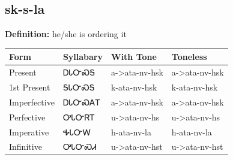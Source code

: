 \documentclass{article}%
\begin{document}
\subsection*{sk-s-la}%
\textbf{Definition: }%
he/she is ordering it%
\\[0.5em]%
\begin{tabular}{|l|l|l|l|}%
\hline%
\textbf{Form}&\textbf{Syllabary}&\textbf{With Tone}&\textbf{Toneless}\\%
\hline%
Present&ᎠᏓᏅᏍᎦ&a{-}>ata{-}nv{-}hsk&a{-}>ata{-}nv{-}hsk\\%
1st Present&ᎦᏓᏅᏍᎦ&k{-}ata{-}nv{-}hsk&k{-}ata{-}nv{-}hsk\\%
Imperfective&ᎠᏓᏅᏍᎪᎢ&a{-}>ata{-}nv{-}hsk&a{-}>ata{-}nv{-}hsk\\%
Perfective&ᎤᏓᏅᏒᎢ&u{-}>ata{-}nv{-}hs&u{-}>ata{-}nv{-}hs\\%
Imperative&ᎭᏓᏅᎳ&h{-}ata{-}nv{-}la&h{-}ata{-}nv{-}la\\%
Infinitive&ᎤᏓᏅᏍᏗ&u{-}>ata{-}nv{-}hst&u{-}>ata{-}nv{-}hst\\%
\hline%
\end{tabular}%
\\[1em]%
\end{document}
